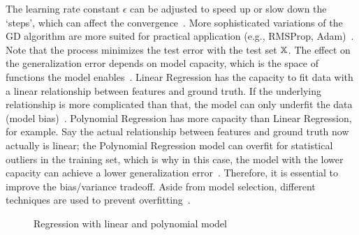 The learning rate constant $\epsilon$ can be adjusted to speed up or slow down the `steps', which
can affect the convergence~\citep{goodfellow_deep_2016}.
More sophisticated variations of the \ac{GD} algorithm are more suited for practical
application (e.g., RMSProp, Adam)~\citep{geron_hands-machine_2017}.
Note that the process minimizes the test error with the test set $\mathbb{X}$.
The effect on the generalization error depends on model capacity, which is the space of functions
the model enables~\citep{goodfellow_deep_2016}.
Linear Regression has the capacity to fit data with a linear relationship between features and
ground truth.
If the underlying relationship is more complicated than that, the model can only underfit the data
(model bias)~\citep{goodfellow_deep_2016}.
Polynomial Regression has more capacity than Linear Regression, for example.
Say the actual relationship between features and ground truth now actually is linear;
the Polynomial Regression model can overfit for statistical outliers in the training set, which is why
in this case, the model with the lower capacity can achieve a lower generalization
error~\citep{geron_hands-machine_2017}.
Therefore, it is essential to improve the bias/variance tradeoff.
Aside from model selection, different techniques are used to prevent
overfitting~\citep{goodfellow_deep_2016}.
\begin{figure}[h]
    \centering
    \caption[Regression over- and underfitting]{%
        Regression with linear and polynomial model\label{fig:examples}
    }
\end{figure}

